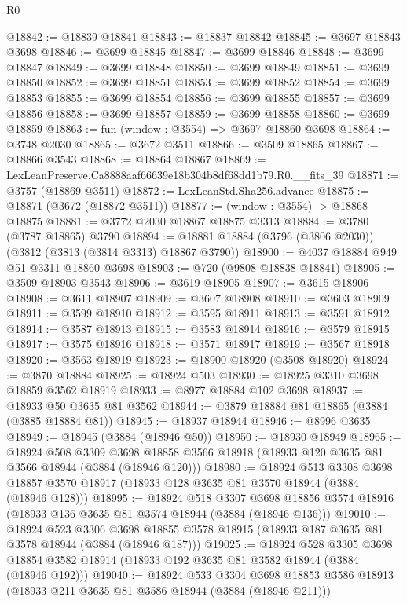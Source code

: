 \begin{lexlean}{R0}
\begin{coremodule}
@18842 := @18839 @18841
@18843 := @18837 @18842
@18845 := @3697 @18843 @3698
@18846 := @3699 @18845
@18847 := @3699 @18846
@18848 := @3699 @18847
@18849 := @3699 @18848
@18850 := @3699 @18849
@18851 := @3699 @18850
@18852 := @3699 @18851
@18853 := @3699 @18852
@18854 := @3699 @18853
@18855 := @3699 @18854
@18856 := @3699 @18855
@18857 := @3699 @18856
@18858 := @3699 @18857
@18859 := @3699 @18858
@18860 := @3699 @18859
@18863 := fun (window : @3554) => @3697 @18860 @3698
@18864 := @3748 @2030
@18865 := @3672 @3511
@18866 := @3509 @18865
@18867 := @18866 @3543
@18868 := @18864 @18867
@18869 := LexLeanPreserve.Ca8888aaf66639e18b304b8df68dd1b79.R0.__fits_39
@18871 := @3757 (@18869 @3511)
@18872 := LexLeanStd.Sha256.advance
@18875 := @18871 (@3672 (@18872 @3511))
@18877 := (window : @3554) -> @18868 @18875
@18881 := @3772 @2030 @18867 @18875 @3313
@18884 := @3780 (@3787 @18865) @3790
@18894 := @18881 @18884 (@3796 (@3806 @2030)) (@3812 (@3813 (@3814 @3313) @18867 @3790))
@18900 := @4037 @18884 @949 @51 @3311 @18860 @3698
@18903 := @720 (@9808 @18838 @18841)
@18905 := @3509 @18903 @3543
@18906 := @3619 @18905
@18907 := @3615 @18906
@18908 := @3611 @18907
@18909 := @3607 @18908
@18910 := @3603 @18909
@18911 := @3599 @18910
@18912 := @3595 @18911
@18913 := @3591 @18912
@18914 := @3587 @18913
@18915 := @3583 @18914
@18916 := @3579 @18915
@18917 := @3575 @18916
@18918 := @3571 @18917
@18919 := @3567 @18918
@18920 := @3563 @18919
@18923 := @18900 @18920 (@3508 @18920)
@18924 := @3870 @18884
@18925 := @18924 @503
@18930 := @18925 @3310 @3698 @18859 @3562 @18919
@18933 := @8977 @18884 @102 @3698
@18937 := @18933 @50 @3635 @81 @3562
@18944 := @3879 @18884 @81 @18865 (@3884 (@3885 @18884 @81))
@18945 := @18937 @18944
@18946 := @8996 @3635
@18949 := @18945 (@3884 (@18946 @50))
@18950 := @18930 @18949
@18965 := @18924
    @508
    @3309
    @3698
    @18858
    @3566
    @18918
    (@18933 @120 @3635 @81 @3566 @18944 (@3884 (@18946 @120)))
@18980 := @18924
    @513
    @3308
    @3698
    @18857
    @3570
    @18917
    (@18933 @128 @3635 @81 @3570 @18944 (@3884 (@18946 @128)))
@18995 := @18924
    @518
    @3307
    @3698
    @18856
    @3574
    @18916
    (@18933 @136 @3635 @81 @3574 @18944 (@3884 (@18946 @136)))
@19010 := @18924
    @523
    @3306
    @3698
    @18855
    @3578
    @18915
    (@18933 @187 @3635 @81 @3578 @18944 (@3884 (@18946 @187)))
@19025 := @18924
    @528
    @3305
    @3698
    @18854
    @3582
    @18914
    (@18933 @192 @3635 @81 @3582 @18944 (@3884 (@18946 @192)))
@19040 := @18924
    @533
    @3304
    @3698
    @18853
    @3586
    @18913
    (@18933 @211 @3635 @81 @3586 @18944 (@3884 (@18946 @211)))

\end{coremodule}
\end{lexlean}
